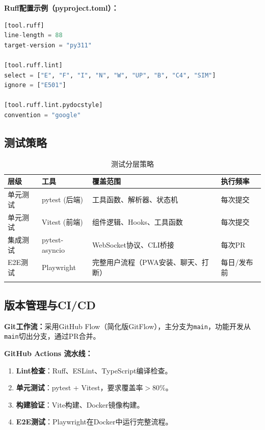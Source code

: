 \documentclass[fontset=mac,a4paper,11pt]{ctexart}
\begin{document}
\textbf{Ruff配置示例（pyproject.toml）：}
\begin{lstlisting}[language=Python, caption=Ruff配置]
[tool.ruff]
line-length = 88
target-version = "py311"

[tool.ruff.lint]
select = ["E", "F", "I", "N", "W", "UP", "B", "C4", "SIM"]
ignore = ["E501"]

[tool.ruff.lint.pydocstyle]
convention = "google"
\end{lstlisting}

\subsection{测试策略}

\begin{table}[H]
\centering
\caption{测试分层策略}
\label{tab:testing}
\begin{tabular}{L{2.5cm}L{3cm}L{4cm}L{3.5cm}}
\toprule
\textbf{层级} & \textbf{工具} & \textbf{覆盖范围} & \textbf{执行频率} \\
\midrule
{}
单元测试 & pytest (后端) & 工具函数、解析器、状态机 & 每次提交 \\
单元测试 & Vitest (前端) & 组件逻辑、Hooks、工具函数 & 每次提交 \\
集成测试 & pytest-asyncio & WebSocket协议、CLI桥接 & 每次PR \\
E2E测试 & Playwright & 完整用户流程（PWA安装、聊天、打断） & 每日/发布前 \\
\bottomrule
\end{tabular}
\end{table}

\subsection{版本管理与CI/CD}

\textbf{Git工作流：}采用GitHub Flow（简化版GitFlow），主分支为\texttt{main}，功能开发从\texttt{main}切出分支，通过PR合并。

\textbf{GitHub Actions 流水线：}
\begin{enumerate}[leftmargin=2em]
\item \textbf{Lint检查}：Ruff、ESLint、TypeScript编译检查。
\item \textbf{单元测试}：pytest + Vitest，要求覆盖率$>$80\%。
\item \textbf{构建验证}：Vite构建、Docker镜像构建。
\item \textbf{E2E测试}：Playwright在Docker中运行完整流程。
\end{enumerate}
\end{document}

